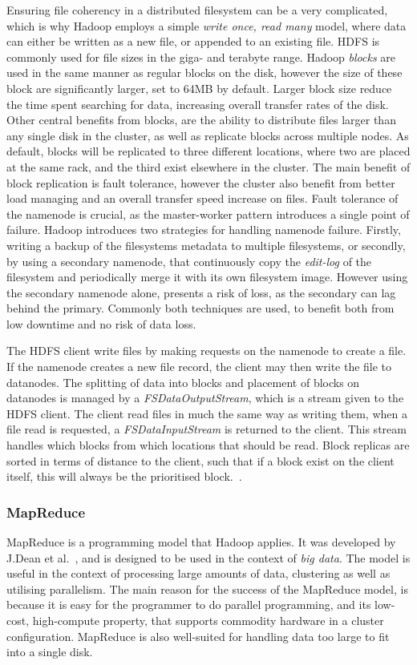 Ensuring file coherency in a distributed filesystem can be a very complicated, which is why Hadoop employs a simple \emph{write once, read many} model, where data can either be written as a new file, or appended to an existing file. HDFS is commonly used for file sizes in the giga- and terabyte range. Hadoop \emph{blocks} are used in the same manner as regular blocks on the disk, however the size of these block are significantly larger, set to 64MB by default. Larger block size reduce the time spent searching for data, increasing overall transfer rates of the disk. Other central benefits from blocks, are the ability to distribute files larger than any single disk in the cluster, as well as replicate blocks across multiple nodes. 
As default, blocks will be replicated to three different locations, where two are placed at the same rack, and the third exist elsewhere in the cluster. The main benefit of block replication is fault tolerance, however the cluster also benefit from better load managing and an overall transfer speed increase on files. Fault tolerance of the namenode is crucial, as the master-worker pattern introduces a single point of failure. Hadoop introduces two strategies for handling namenode failure. Firstly, writing a backup of the filesystems metadata to multiple filesystems, or secondly, by using a secondary namenode, that continuously copy the \emph{edit-log} of the filesystem and periodically merge it with its own filesystem image. However using the secondary namenode alone, presents a risk of loss, as the secondary can lag behind the primary. Commonly both techniques are used, to benefit both from low downtime and no risk of data loss.

The HDFS client write files by making requests on the namenode to create a file. If the namenode creates a new file record, the client may then write the file to datanodes. The splitting of data into blocks and placement of blocks on datanodes is managed by a \emph{FSDataOutputStream}, which is a stream given to the HDFS client. The client read files in much the same way as writing them, when a file read is requested, a \emph{FSDataInputStream} is returned to the client. This stream handles which blocks from which locations that should be read. Block replicas are sorted in terms of distance to the client, such that if a block exist on the client itself, this will always be the prioritised block.~\cite{hadoopIntro}.

\subsubsection{MapReduce}\label{sec:mapreduce_programming_model}
MapReduce is a programming model that Hadoop applies. It was developed by J.\@ Dean et al.~\cite{DeanMapReduce}, and is designed to be used in the context of \emph{big data}. The model is useful in the context of processing large amounts of data, clustering as well as utilising parallelism. The main reason for the success of the MapReduce model, is because it is easy for the programmer to do parallel programming, and its low-cost, high-compute property, that supports commodity hardware in a cluster configuration. MapReduce is also well-suited for handling data too large to fit into a single disk.

